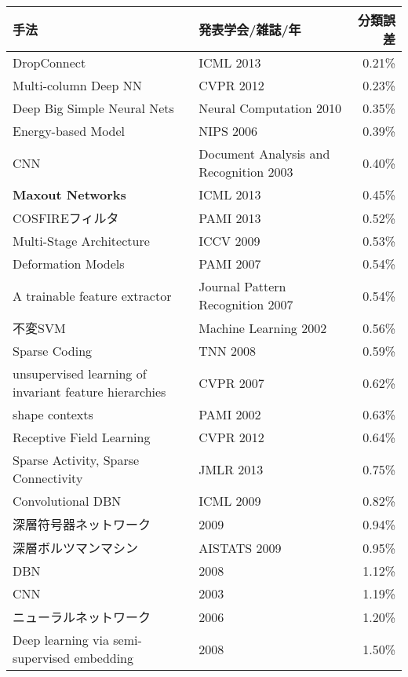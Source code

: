     \begin{tabular}{|p{7cm}|p{5cm}|r|}\hline
    手法 & 発表学会/雑誌/年 & 分類誤差 \\ \hline
    DropConnect \cite{wan2013regularization}& ICML 2013 & 0.21\% \\ \hline
    Multi-column Deep NN \cite{ciresan2012multi-column}& CVPR 2012 & 0.23\% \\ \hline
    Deep Big Simple Neural Nets \cite{ciresan2010deep}& Neural Computation 2010 & 0.35\% \\ \hline
    Energy-based Model\cite{ranzato2006efficient}& NIPS 2006 & 0.39\% \\ \hline
    CNN \cite{simard2003best}& Document Analysis and Recognition 2003 & 0.40\% \\ \hline
    \textbf{Maxout Networks} \cite{goodfellow2013maxout}& ICML 2013 & 0.45\% \\ \hline
    COSFIREフィルタ \cite{azzopardi2013trainable}& PAMI 2013 & 0.52\% \\ \hline
    Multi-Stage Architecture \cite{jarrett2009what}& ICCV 2009 & 0.53\% \\ \hline
    Deformation Models \cite{keysers2007deformation}& PAMI 2007 & 0.54\% \\ \hline
    A trainable feature extractor \cite{lauer2007a-trainable}& Journal Pattern Recognition 2007   & 0.54\% \\ \hline
    不変SVM \cite{decoste2002training}& Machine Learning 2002 & 0.56\% \\ \hline
    Sparse Coding \cite{labusch2008simple}& TNN 2008 & 0.59\% \\ \hline
    unsupervised learning of invariant feature hierarchies \cite{ranzato2007unsupervised}& CVPR 2007 & 0.62\% \\ \hline
    shape contexts \cite{belongie2002shape}& PAMI 2002 & 0.63\% \\ \hline
    Receptive Field Learning \cite{jia2012beyond}& CVPR 2012 & 0.64\% \\ \hline
    Sparse Activity, Sparse Connectivity \cite{thom2013sparse}& JMLR 2013 & 0.75\% \\ \hline
    Convolutional DBN \cite{lee2009convolutional}& ICML 2009 & 0.82\% \\ \hline
    深層符号器ネットワーク \cite{min2009large-margin}& 2009 & 0.94\% \\ \hline
    深層ボルツマンマシン \cite{salakhutdinov2009deep}& AISTATS 2009 & 0.95\% \\ \hline
    DBN \cite{dahl2008cs81:}& 2008 & 1.12\% \\ \hline
    CNN  \cite{simard2003best}& 2003 & 1.19\% \\ \hline
    ニューラルネットワーク \cite{hinton2006reducing}& 2006 & 1.20\% \\ \hline
    Deep learning via semi-supervised embedding \cite{weston2012deep}& 2008 & 1.50\% \\ \hline
    \end{tabular}%
